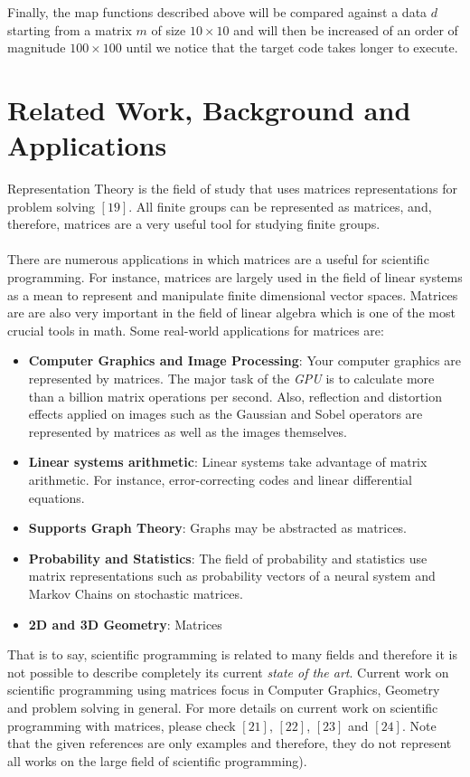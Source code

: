 \documentclass[conference]{IEEEtran}
\begin{document}
Finally, the map functions described above will be compared against a data $d$ starting from a matrix $m$ of size $10\times10$ and will then be increased of an order of magnitude $100\times100$ until we notice that the target code takes longer to execute.

\section{Related Work, Background and Applications}
Representation Theory is the field of study that uses matrices representations for problem solving  $[19]$. All finite groups can be represented as matrices, and, therefore, matrices are a very useful tool for studying finite groups.
\\\\
There are numerous applications in which matrices are a useful for scientific programming. For instance, matrices are largely used in the field of linear systems as a mean to represent and manipulate finite dimensional vector spaces. Matrices are are also very important in the field of linear algebra which is one of the most crucial tools in math. Some real-world applications for matrices are:  

\begin{itemize}
	\item \textbf{Computer Graphics and Image Processing}: Your computer graphics are represented by matrices. The major task of the \textit{GPU} is to calculate more than a billion matrix operations per second. Also, reflection and distortion effects applied on images such as the Gaussian and Sobel operators are represented by matrices as well as the images themselves.
	\item \textbf{Linear systems arithmetic}: Linear systems take advantage of matrix arithmetic. For instance, error-correcting codes and linear differential equations.
	\item \textbf{Supports Graph Theory}: Graphs may be abstracted as matrices.
	\item \textbf{Probability and Statistics}: The field of probability and statistics use matrix representations such as probability vectors of a neural system and Markov Chains on stochastic matrices.
	\item \textbf{2D and 3D Geometry}: Matrices 
\end{itemize}

That is to say, scientific programming is related to many fields and therefore it is not possible to describe completely its current \textit{state of the art}. Current work on scientific programming using matrices focus in Computer Graphics, Geometry and problem solving in general. For more details on current work on scientific programming with matrices, please check $[21]$, $[22]$, $[23]$ and $[24]$. Note that the given references are only examples and therefore, they do not represent all works on the large field of scientific programming). 
\end{document}
